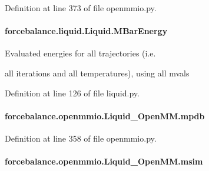 Definition at line 373 of file openmmio.\-py.

\hypertarget{classforcebalance_1_1liquid_1_1Liquid_a6c00a87ae43f535118b77d41af51a5d7}{
\paragraph[{M\-Bar\-Energy}]{\setlength{\rightskip}{0pt plus 5cm}forcebalance.\-liquid.\-Liquid.\-M\-Bar\-Energy\hspace{0.3cm}{\ttfamily [inherited]}}}\label{classforcebalance_1_1liquid_1_1Liquid_a6c00a87ae43f535118b77d41af51a5d7}


Evaluated energies for all trajectories (i.\-e. 

all iterations and all temperatures), using all mvals 

Definition at line 126 of file liquid.\-py.

\hypertarget{classforcebalance_1_1openmmio_1_1Liquid__OpenMM_aaaa8d66c5bb45d847e1fbcd3953fe0d3}{
\paragraph[{mpdb}]{\setlength{\rightskip}{0pt plus 5cm}forcebalance.\-openmmio.\-Liquid\-\_\-\-Open\-M\-M.\-mpdb}}\label{classforcebalance_1_1openmmio_1_1Liquid__OpenMM_aaaa8d66c5bb45d847e1fbcd3953fe0d3}


Definition at line 358 of file openmmio.\-py.

\hypertarget{classforcebalance_1_1openmmio_1_1Liquid__OpenMM_acf60da4350bb882795a8143b1b85ca57}{
\paragraph[{msim}]{\setlength{\rightskip}{0pt plus 5cm}forcebalance.\-openmmio.\-Liquid\-\_\-\-Open\-M\-M.\-msim}}\label{classforcebalance_1_1openmmio_1_1Liquid__OpenMM_acf60da4350bb882795a8143b1b85ca57}


